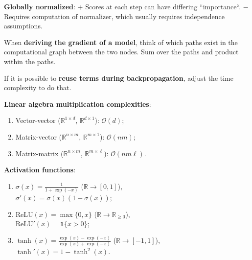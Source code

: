 \documentclass{article}
\newenvironment{topic}[1]
{\begin{tcolorbox}[
  title=#1,
  breakable,
  colback=white,
  colframe=black,
  fonttitle={\bfseries\sffamily},
  sharp corners,
  boxrule=0.5pt,
  boxsep=0.1cm,
  top=0cm,
  bottom=0cm,
  left=0.1cm,
  right=0.1cm,
  enhanced jigsaw,
]}
{\end{tcolorbox}}
\begin{document}
\begin{multicols}{3}
\begin{topic}{Axes of modelling}
  \textbf{Globally normalized}: $+$ Scores at each step can have differing
  ``importance``. $-$ Requires computation of normalizer, which usually
  requires independence assumptions.
\end{topic}

\begin{topic}{Tips}
  When \textbf{deriving the gradient of a model}, think of which paths exist in
  the computational graph between the two nodes. Sum over the paths and product
  within the paths.

  If it is possible to \textbf{reuse terms during backpropagation}, adjust the
  time complexity to do that.

  \textbf{Linear algebra multiplication complexities}:
  \begin{enumerate}
    \item Vector-vector ($\mathbb{R}^{1\times d}$, $\mathbb{R}^{d\times 1}$):
      $\mathcal{O}(d)$;
    \item Matrix-vector ($\mathbb{R}^{n\times m}$, $\mathbb{R}^{m\times 1}$):
      $\mathcal{O}(nm)$;
    \item Matrix-matrix ($\mathbb{R}^{n\times m}$, $\mathbb{R}^{m\times
      \ell}$): $\mathcal{O}(nm\ell)$.
  \end{enumerate}

  \textbf{Activation functions}:
  \begin{enumerate}
    \item $\sigma(x) = \frac{1}{1+\exp(-x)}$ ($\mathbb{R} \to [0,1]$), \\
      $\sigma'(x) = \sigma(x)(1-\sigma(x))$;
    \item $\mathrm{ReLU}(x) = \max\{0, x\}$ ($\mathbb{R} \to
      \mathbb{R}_{\geq 0}$), \\ $\mathrm{ReLU}'(x) = \mathbb{1}\{ x > 0 \}$;
    \item $\tanh(x) = \frac{\exp(x) - \exp(-x)}{\exp(x) + \exp(-x)}$ ($\mathbb{R} \to [-1, 1]$),\\
      $\tanh'(x) = 1 - \tanh^2(x)$.
  \end{enumerate}

\end{topic}

\end{multicols}
\end{document}
